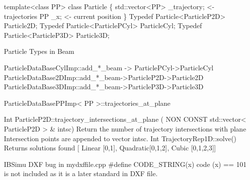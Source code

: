 \documentclass[12pt,a4paper]{article}
\begin{document}
template<class PP> class Particle \{
	std::vector<PP> 	\_trajectory; <- trajectories
       PP				\_x; <- current position
\}
Typedef Particle<ParticleP2D> Particle2D;
Typedef Particle<ParticlePCyl> ParticleCyl;
Typedef Particle<ParticleP3D> Particle3D;

Particle Types in Beam

ParticleDataBaseCylImp::add\_*\_beam -> ParticlePCyl->ParticleCyl
ParticleDataBase2DImp::add\_*\_beam->ParticleP2D->Particle2D
ParticleDataBase3DImp::add\_*\_beam->ParticleP3D->Particle3D



ParticleDataBasePPImp< PP >::trajectories\_at\_plane 


Int ParticleP2D::trajectory\_intersections\_at\_plane
( NON CONST	std::vector< ParticleP2D > \& 	intsc)
Return the number of trajectory intersections with plane
Intersection points are appended to vector intsc.
Int TrajectoryRep1D::solve()
Returns solutions found [ Linear [0,1], Quadratic[0,1,2], Cubic [0,1,2,3]]

IBSimu DXF bug in mydxffile.cpp \#define CODE\_STRING(x) code (x) == 101 is not included as it is a later standard in DXF file.
\end{document}
